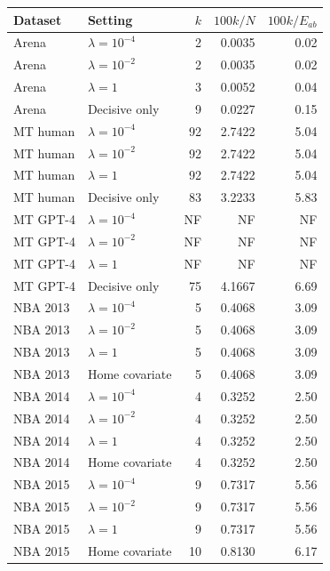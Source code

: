 \begin{tabular}{llrrr}\toprule Dataset & Setting & $k$ & $100k/N$ & $100k/E_{ab}$ \\ \midrule
Arena & $\lambda=10^{-4}$ & 2 & 0.0035 & 0.02 \\
Arena & $\lambda=10^{-2}$ & 2 & 0.0035 & 0.02 \\
Arena & $\lambda=1$ & 3 & 0.0052 & 0.04 \\
Arena & Decisive only & 9 & 0.0227 & 0.15 \\
MT human & $\lambda=10^{-4}$ & 92 & 2.7422 & 5.04 \\
MT human & $\lambda=10^{-2}$ & 92 & 2.7422 & 5.04 \\
MT human & $\lambda=1$ & 92 & 2.7422 & 5.04 \\
MT human & Decisive only & 83 & 3.2233 & 5.83 \\
MT GPT-4 & $\lambda=10^{-4}$ & NF & NF & NF \\
MT GPT-4 & $\lambda=10^{-2}$ & NF & NF & NF \\
MT GPT-4 & $\lambda=1$ & NF & NF & NF \\
MT GPT-4 & Decisive only & 75 & 4.1667 & 6.69 \\
NBA 2013 & $\lambda=10^{-4}$ & 5 & 0.4068 & 3.09 \\
NBA 2013 & $\lambda=10^{-2}$ & 5 & 0.4068 & 3.09 \\
NBA 2013 & $\lambda=1$ & 5 & 0.4068 & 3.09 \\
NBA 2013 & Home covariate & 5 & 0.4068 & 3.09 \\
NBA 2014 & $\lambda=10^{-4}$ & 4 & 0.3252 & 2.50 \\
NBA 2014 & $\lambda=10^{-2}$ & 4 & 0.3252 & 2.50 \\
NBA 2014 & $\lambda=1$ & 4 & 0.3252 & 2.50 \\
NBA 2014 & Home covariate & 4 & 0.3252 & 2.50 \\
NBA 2015 & $\lambda=10^{-4}$ & 9 & 0.7317 & 5.56 \\
NBA 2015 & $\lambda=10^{-2}$ & 9 & 0.7317 & 5.56 \\
NBA 2015 & $\lambda=1$ & 9 & 0.7317 & 5.56 \\
NBA 2015 & Home covariate & 10 & 0.8130 & 6.17 \\
\bottomrule
\end{tabular}
